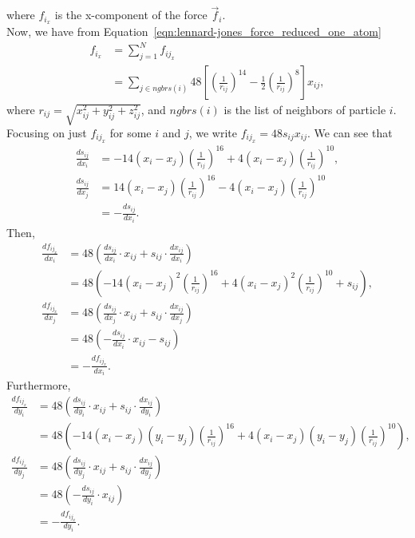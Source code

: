 \documentclass[../Main.tex]{subfiles}
\begin{document}
where $f_{i_{x}}$ is the x-component of the force $\vec{f}_{i}$. \\
Now, we have from Equation~\ref{eqn:lennard-jones_force_reduced_one_atom}
\begin{align*}
f_{i_{x}} &= \sum_{j=1}^{N} f_{ij_{x}} \\
&= \sum_{j\in ngbrs(i)} 48\left[ \left( \frac{1}{r_{ij}}\right)^{14} - \frac{1}{2}\left( \frac{1}{r_{ij}}\right)^{8} \right]x_{ij},
\end{align*} where $r_{ij} = \sqrt{x_{ij}^{2} + y_{ij}^{2} + z_{ij}^{2}}$, and $ngbrs(i)$ is the list of neighbors of particle $i$. \\
Focusing on just $f_{ij_{x}}$ for some $i$ and $j$, we write $f_{ij_{x}} = 48s_{ij}x_{ij}$. We can see that
\begin{align*}
\frac{ds_{ij}}{dx_{i}} & = -14\left(x_{i} - x_{j}\right)\left(\frac{1}{r_{ij}}\right)^{16}+ 4\left(x_{i} - x_{j}\right)\left(\frac{1}{r_{ij}}\right)^{10}, \\
\frac{ds_{ij}}{dx_{j}} & = 14\left(x_{i} - x_{j}\right)\left(\frac{1}{r_{ij}}\right)^{16} - 4\left(x_{i} - x_{j}\right)\left(\frac{1}{r_{ij}}\right)^{10} \\
& = - \frac{ds_{ij}}{dx_{i}}.
\end{align*}
Then,
\begin{align}
\frac{df_{ij_{x}}}{dx_{i}} &= 48\left(\frac{ds_{ij}}{dx_{i}}\cdot x_{ij} + s_{ij}\cdot \frac{dx_{ij}}{dx_{i}}\right) \nonumber \\
&= 48\left(-14\left(x_{i} - x_{j}\right)^{2}\left(\frac{1}{r_{ij}}\right)^{16}+ 4\left(x_{i} - x_{j}\right)^{2}\left(\frac{1}{r_{ij}}\right)^{10} +  s_{ij}\right), \label{eqn:i_point_derivate_x_i} \\
\frac{df_{ij_{x}}}{dx_{j}} &= 48\left(\frac{ds_{ij}}{dx_{j}}\cdot x_{ij} + s_{ij}\cdot \frac{dx_{ij}}{dx_{j}}\right) \nonumber \\
&= 48\left(- \frac{ds_{ij}}{dx_{i}}\cdot x_{ij} - s_{ij}\right) \nonumber \\
&= -\frac{df_{ij_{x}}}{dx_{i}}. \label{eqn:negative_j_point_derivative_x}
\end{align}
Furthermore,
\begin{align}
\frac{df_{ij_{x}}}{dy_{i}} &= 48\left(\frac{ds_{ij}}{dy_{i}}\cdot x_{ij} + s_{ij}\cdot \frac{dx_{ij}}{dy_{i}}\right) \nonumber \\
&= 48\left(-14\left(x_{i} - x_{j}\right)\left(y_{i} - y_{j}\right)\left(\frac{1}{r_{ij}}\right)^{16}+ 4\left(x_{i} - x_{j}\right)\left(y_{i} - y_{j}\right)\left(\frac{1}{r_{ij}}\right)^{10}\right), \label{eqn:i_point_derivate_y_i} \\
\frac{df_{ij_{x}}}{dy_{j}} &= 48\left(\frac{ds_{ij}}{dy_{j}}\cdot x_{ij} + s_{ij}\cdot \frac{dx_{ij}}{dy_{j}}\right) \nonumber \\
&= 48\left(-\frac{ds_{ij}}{dy_{i}}\cdot x_{ij}\right) \nonumber\\
& = -\frac{df_{ij_{x}}}{dy_{i}}. \label{eqn:negative_j_point_derivative_y}
\end{align}
\end{document}
